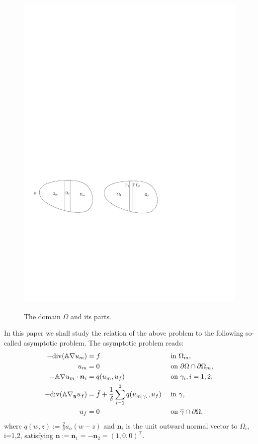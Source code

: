 \documentclass[a4paper]{article}
\def\vc#1{\mathbf{\boldsymbol{#1}}}     %
\def\tn#1{{\mathbb{#1}}}    %
\def\div{{\rm div}}
\def\yy{{\vc y}}
\begin{document}
\begin{figure}[h]
\centering
\includegraphics[width=12cm]{figures/domains}
\label{fig:omegas}
\caption{The domain $\Omega$ and its parts.}
\end{figure}

In this paper we shall study the relation of the above problem to the following so-called asymptotic problem.
The asymptotic problem reads:
\begin{subequations}
\label{eq:asymptotic_pde}
\begin{align}
-\div(\tn A\nabla u_m) &= f &&\mbox{ in }\Omega_m,\\
u_m &= 0 &&\mbox{ on }\partial\Omega\cap\partial\Omega_m,\\
-\tn A\nabla u_m\cdot\vc n_i &= q(u_m,u_f) &&\mbox{ on }\gamma_i,i=1,2,\\
-\div(\tn A\nabla_\yy u_f) &= \bar f + \frac1\delta\sum_{i=1}^2 q(u_{m|\gamma_i},u_f) &&\mbox{ in }\gamma,\\
u_f &= 0 &&\mbox{ on }\overline\gamma\cap\partial\Omega,
\end{align}
\end{subequations}
where $q(w,z):=\frac2\delta a_n(w-z)$ and $\vc n_i$ is the unit outward normal vector to $\Omega_i$, i=1,2, satisfying $\vc n:=\vc n_1=-\vc n_2=(1,0,0)^\top$.
\end{document}
